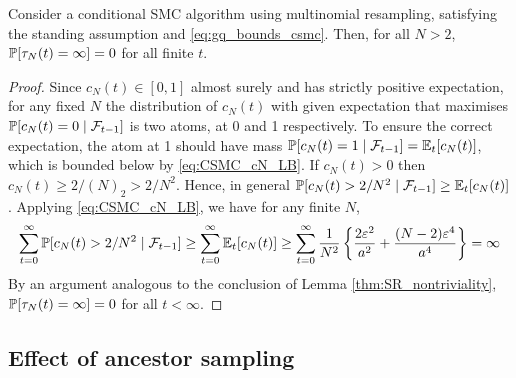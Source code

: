 \begin{lemma}\label{thm:CSMC_nontriviality}
Consider a conditional SMC algorithm using multinomial resampling, satisfying the standing assumption and \eqref{eq:gq_bounds_csmc}. 
Then, for all $N>2$, $\mathbb{P}[ \tau_N(t) = \infty ]=0$ for all finite $t$.
\end{lemma}

\begin{proof}
Since $c_N(t) \in [0,1]$ almost surely and has strictly positive expectation, for any fixed $N$ the distribution of $c_N(t)$ with given expectation that maximises $\mathbb{P}[ c_N(t)=0 \mid \mathcal{F}_{t-1} ]$ is two atoms, at 0 and 1 respectively. To ensure the correct expectation, the atom at 1 should have mass $\mathbb{P}[ c_N(t)=1 \mid \mathcal{F}_{t-1} ] = \mathbb{E}_t [ c_N(t) ]$, which is bounded below by \eqref{eq:CSMC_cN_LB}.
If $c_N(t) > 0$ then $c_N(t) \geq 2/(N)_2 > 2/N^2$. Hence, in general $\mathbb{P}[ c_N(t) > 2/N^2 \mid \mathcal{F}_{t-1} ] \geq \mathbb{E}_t [c_N(t)]$. Applying \eqref{eq:CSMC_cN_LB}, we have for any finite $N$,
\begin{equation*}
\sum_{t=0}^\infty \mathbb{P}[ c_N(t) > 2/N^2 \mid \mathcal{F}_{t-1} ]
\geq \sum_{t=0}^\infty \mathbb{E}_t [ c_N(t) ]
\geq \sum_{t=0}^\infty \frac{1}{N^2} \left\{\frac{2\varepsilon^2}{a^2} + \frac{(N-2)\varepsilon^4}{a^4}  \right\}
= \infty
\end{equation*}
By an argument analogous to the conclusion of Lemma \ref{thm:SR_nontriviality}, $\mathbb{P}[ \tau_N(t) = \infty ] =0$ for all $t < \infty$.
\end{proof}


\subsection{Effect of ancestor sampling}
